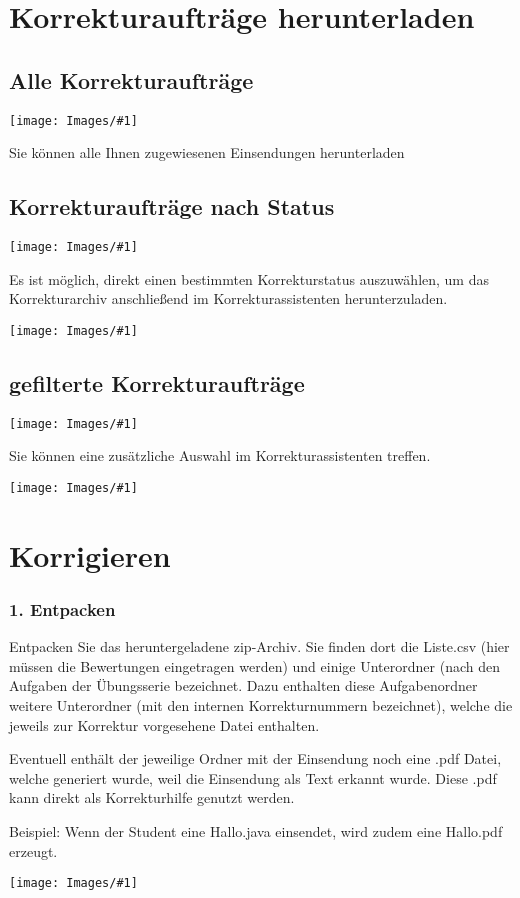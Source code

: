 \documentclass[a4paper,final, parskip]{scrartcl}
\title
{}
\author 
{}
\date{\vspace{12cm}\monthword{\the\month}\space\the\year}
\subtitle
{}
\numberwithin{equation}{section}
\newenvironment{Bilder}
  {\par\raggedbottom\null\noindent\minipage{\textwidth}\centering}
  {\endminipage\vspace{0.7cm}}
\newcommand{\tbild}[1]{
\begin{Bilder}
 \texttt{[image: Images/\#1]}
	\end{Bilder}
}
\begin{document}
\pagestyle{seite}
\section{Korrekturaufträge herunterladen}
\subsection{Alle Korrekturaufträge}
\tbild{pathA.png}
Sie können alle Ihnen zugewiesenen Einsendungen herunterladen

\subsection{Korrekturaufträge nach Status}
\tbild{pathB.png}
Es ist möglich, direkt einen bestimmten Korrekturstatus auszuwählen, um das Korrekturarchiv anschließend im Korrekturassistenten herunterzuladen.
\tbild{pathC.png}

\subsection{gefilterte Korrekturaufträge}
\tbild{pathD.png}
Sie können eine zusätzliche Auswahl im Korrekturassistenten treffen.
\tbild{pathE.png}

\newpage
\section{Korrigieren}
\subsubsection*{1. Entpacken}
Entpacken Sie das heruntergeladene zip-Archiv.
Sie finden dort die Liste.csv (hier müssen die Bewertungen eingetragen werden) und einige Unterordner (nach den Aufgaben der Übungsserie bezeichnet. Dazu enthalten diese Aufgabenordner weitere Unterordner (mit den internen Korrekturnummern bezeichnet), welche die jeweils zur Korrektur vorgesehene Datei enthalten.

Eventuell enthält der jeweilige Ordner mit der Einsendung noch eine .pdf Datei, welche generiert wurde, weil die Einsendung als Text erkannt wurde. Diese .pdf kann direkt als Korrekturhilfe genutzt werden.

Beispiel: Wenn der Student eine Hallo.java einsendet, wird zudem eine Hallo.pdf erzeugt. 

\tbild{sampleB.png}
\end{document}
